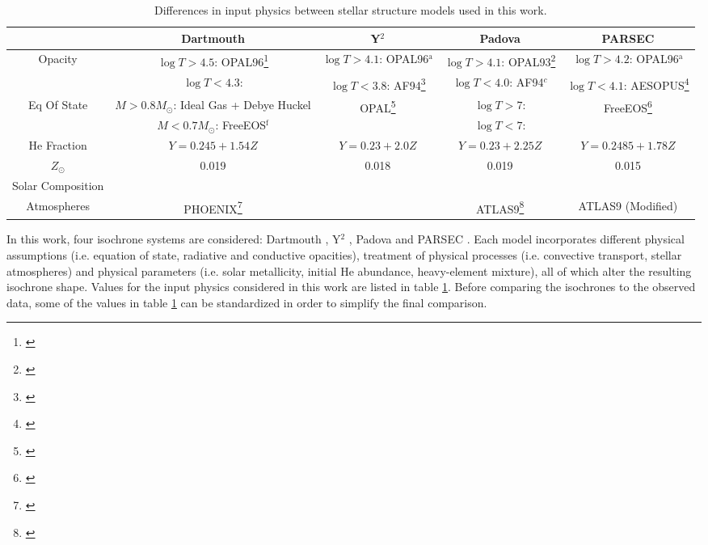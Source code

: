 \documentclass[iop]{emulateapj}
\begin{document}
\begin{table} \centering \tiny
\caption{Differences in input physics between stellar structure models used in this work. \label{tab:isoparams}}
\begin{tabular}{c||c|c|c|c} \hline \hline
	& Dartmouth & Y$^2$ & Padova & PARSEC \\ \hline
	\multirow{2}{*}{Opacity} & $\log T > 4.5$: OPAL96\footnote{ \citet{1996ApJ...464..943I}} & $\log T > 4.1$: OPAL96$^\text{a}$ & $\log T > 4.1$: OPAL93\footnote{\citet{1993ApJ...412..752I}} & $\log T > 4.2$: OPAL96$^\text{a}$ \\
			& $\log T < 4.3$: \citet{2005ApJ...623..585F} & $\log T < 3.8$: AF94\footnote{\citet{1994ApJ...437..879A}} & $\log T < 4.0$: AF94$^c$ & $\log T < 4.1$: AESOPUS\footnote{ \citet{2009AA...508.1539M}} \\ \hline
	\multirow{2}{*}{Eq Of State} & $M > 0.8 M_\odot$: Ideal Gas + Debye Huckel & \multirow{2}{*}{OPAL\footnote{\citet{1996ApJ...456..902R}}} & $\log T > 7$: \citet{1965ZA.....61..241K} & \multirow{2}{*}{FreeEOS\footnote{\citet{Irwin:2012uw}}} \\
			& $M < 0.7 M_\odot$: FreeEOS$^\text{f}$ & & $\log T < 7$: \citet{1990ApJ...350..300M} & \\ \hline
	He Fraction & $Y = 0.245 + 1.54 Z$ & $Y = 0.23 + 2.0 Z$ & $Y = 0.23 + 2.25 Z$ & $Y = 0.2485 + 1.78 Z$ \\
	$Z_\odot$ & 0.019 & 0.018 & 0.019 & 0.015 \\ 
	Solar Composition & \citet{1998SSRv...85..161G} & \citet{1993PhST...47..133G} & \citet{1993PhST...47..133G} & \citet{2011SoPh..268..255C} \\ \hline
	Atmospheres & PHOENIX\footnote{ \citet{2005ApJ...623..585F}} & \citet{1998AAS..130...65L} & ATLAS9\footnote{ \citet{2003IAUS..210P.A20C}} & ATLAS9 (Modified) \\ \hline
\end{tabular}
\end{table}

In this work, four isochrone systems are considered: Dartmouth \citep{Dotter:2007fh}, Y$^2$ \citep{2001ApJS..136..417Y}, Padova \citep{2002AA...391..195G} and PARSEC \citep{2012MNRAS.427..127B}. Each model incorporates different physical assumptions (i.e. equation of state, radiative and conductive opacities), treatment of physical processes (i.e. convective transport, stellar atmospheres) and physical parameters (i.e. solar metallicity, initial He abundance, heavy-element mixture), all of which alter the resulting isochrone shape. Values for the input physics considered in this work are listed in table \ref{tab:isoparams}. Before comparing the isochrones to the observed data, some of the values in table \ref{tab:isoparams} can be standardized in order to simplify the final comparison.
\end{document}
